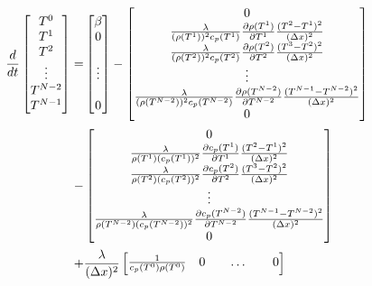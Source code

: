 \documentclass{scrartcl}[12pt, halfparskip]
\begin{document}
\begin{align*}
	\hspace{-6cm}
	\frac{d}{dt} \begin{bmatrix*}
	T^0 \\
	T^1 \\
	T^2 \\
	\vdots \\
	T^{N-2} \\
	T^{N-1}
	\end{bmatrix*} = & 
	\begin{bmatrix}
		\beta \\
		0 \\
		\\
		\vdots \\
		\\
		0
	\end{bmatrix}
	-
	\begin{bmatrix}
			0 \\
			\frac{\lambda}{(\rho(T^1))^2 c_p(T^1)} \frac{\partial \rho (T^1)}{\partial T^1} \frac{(T^2 - T^1)^2}{(\Delta x)^2} \\
			\frac{\lambda}{(\rho(T^2))^2 c_p(T^2)} \frac{\partial \rho (T^2)}{\partial T^2} \frac{(T^3 - T^2)^2}{(\Delta x)^2} \\
			\vdots \\
			\frac{\lambda}{(\rho(T^{N-2}))^2 c_p(T^{N-2})} \frac{\partial \rho (T^{N-2})}{\partial T^{N-2}} \frac{(T^{N-1} - T^{N-2})^2}{(\Delta x)^2} \\	
			0 \\			
	\end{bmatrix} \\
	- &
	\begin{bmatrix}
		0 \\
		\frac{\lambda}{\rho(T^1) (c_p(T^1))^2} \frac{\partial c_p (T^1)}{\partial T^1} \frac{(T^2 - T^1)^2}{(\Delta x)^2} \\
		\frac{\lambda}{\rho(T^2) (c_p(T^2))^2} \frac{\partial c_p (T^2)}{\partial T^2} \frac{(T^3 - T^2)^2}{(\Delta x)^2} \\
		\vdots \\
		\frac{\lambda}{\rho(T^{N-2}) (c_p(T^{N-2}))^2} \frac{\partial c_p (T^{N-2})}{\partial T^{N-2}} \frac{(T^{N-1} - T^{N-2})^2}{(\Delta x)^2} \\	
		0 \\			
	\end{bmatrix} \\
	+ & \frac{\lambda}{(\Delta x)^2}
	\begin{bmatrix}
		\frac{1}{c_p(T^0) \rho(T^0)} & 0 & & \dots & & 0 \\

\end{bmatrix}
\end{align*}
\end{document}
